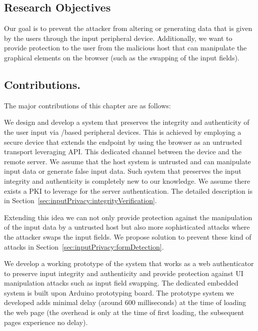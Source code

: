 \subsection{Research Objectives}

Our goal is to prevent the attacker from altering or generating data that is given by the users through the input peripheral device. Additionally, we want to provide protection to the user from the malicious host that can manipulate the graphical elements on the browser (such as the swapping of the input fields).


\subsection{Contributions.} The major contributions of this chapter are as follows:


 \mypara We design and develop a system that preserves the integrity and authenticity of the user input via \usb/\bluetooth based peripheral devices. This is achieved by employing a secure \usb device that extends the \tls endpoint by using the browser as an untrusted transport leveraging \webusb API. This dedicated \tls channel between the \usb device and the remote server. We assume that the host system is untrusted and can manipulate input data or generate false input data. Such system that preserves the input integrity and authenticity is completely new to our knowledge. We assume there exists a PKI to leverage for the server authentication. The detailed description is in Section~\ref{sec:inputPrivacy:integrityVerification}.

\mypara Extending this idea we can not only provide protection against the manipulation of the input data by a untrusted host but also more sophisticated attacks where the attacker swaps the input fields. We propose solution to prevent these kind of attacks in Section~\ref{sec:inputPrivacy:formDetection}. 
  
\mypara We develop a working prototype of the system that works as a web authenticator to preserve input integrity and authenticity and provide protection against UI manipulation attacks such as input field swapping. The dedicated embedded system is built upon Arduino prototyping board. The prototype system we developed adds minimal delay (around $600$ milliseconds) at the time of loading the web page (the overhead is only at the time of first loading, the subsequent pages experience no delay). 


